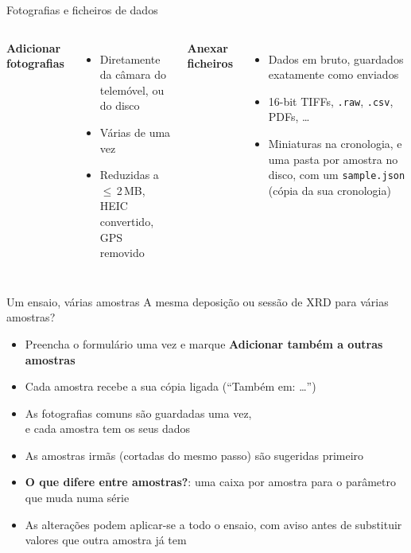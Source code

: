 \documentclass[aspectratio=169,11pt]{beamer}
\newcommand{\ui}[1]{\textsf{\textbf{#1}}}
\begin{document}
\begin{frame}{Fotografias e ficheiros de dados}
  \begin{columns}[T]
    \textbf{\ui{Adicionar fotografias}}
    \begin{itemize}
      \item Diretamente da câmara do telemóvel, ou do disco
      \item Várias de uma vez
      \item Reduzidas a $\leq$\,2\,MB, HEIC convertido, GPS removido
    \end{itemize}
    \textbf{\ui{Anexar ficheiros}}
    \begin{itemize}
      \item Dados em bruto, \alert{guardados exatamente como enviados}
      \item 16-bit TIFFs, \texttt{.raw}, \texttt{.csv}, PDFs, \ldots
      \item Miniaturas na cronologia, e uma pasta por amostra no disco, com um \texttt{sample.json} (cópia da sua cronologia)
    \end{itemize}
  \end{columns}
\end{frame}

\begin{frame}{Um ensaio, várias amostras}
  A mesma deposição ou sessão de XRD para várias amostras?
  \begin{itemize}
    \item Preencha o formulário uma vez e marque \ui{Adicionar também a outras amostras}
    \item Cada amostra recebe a sua cópia ligada (``Também em: \ldots'')
    \item As fotografias comuns são guardadas uma vez,\\ e cada amostra tem os seus dados
    \item As amostras irmãs (cortadas do mesmo passo) são sugeridas primeiro
    \item \ui{O que difere entre amostras?}: uma caixa por amostra para o
          parâmetro que muda numa série
    \item As alterações podem aplicar-se a todo o ensaio, com aviso antes
          de substituir valores que outra amostra já tem
  \end{itemize}
\end{frame}
\end{document}
